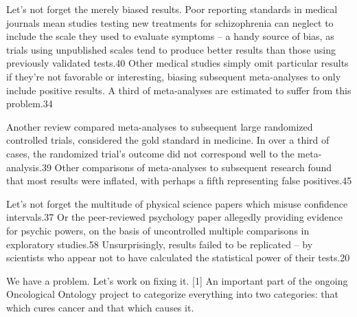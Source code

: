 Let’s not forget the merely biased results. Poor reporting standards in medical journals mean studies testing new treatments for schizophrenia can neglect to include the scale they used to evaluate symptoms – a handy source of bias, as trials using unpublished scales tend to produce better results than those using previously validated tests.40 Other medical studies simply omit particular results if they’re not favorable or interesting, biasing subsequent meta-analyses to only include positive results. A third of meta-analyses are estimated to suffer from this problem.34

Another review compared meta-analyses to subsequent large randomized controlled trials, considered the gold standard in medicine. In over a third of cases, the randomized trial’s outcome did not correspond well to the meta-analysis.39 Other comparisons of meta-analyses to subsequent research found that most results were inflated, with perhaps a fifth representing false positives.45

Let’s not forget the multitude of physical science papers which misuse confidence intervals.37 Or the peer-reviewed psychology paper allegedly providing evidence for psychic powers, on the basis of uncontrolled multiple comparisons in exploratory studies.58 Unsurprisingly, results failed to be replicated – by scientists who appear not to have calculated the statistical power of their tests.20

We have a problem. Let’s work on fixing it.
[1]	An important part of the ongoing Oncological Ontology project to categorize everything into two categories: that which cures cancer and that which causes it.